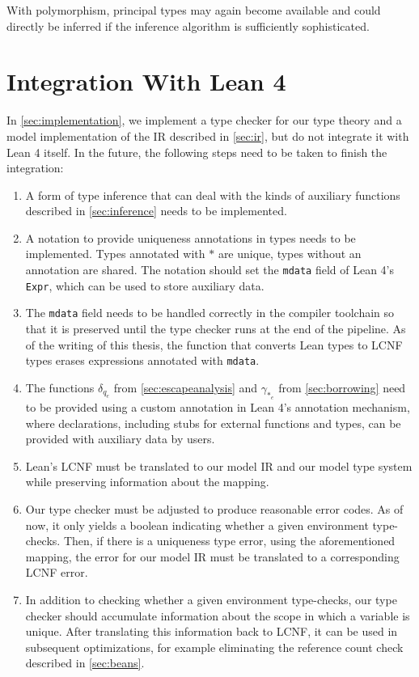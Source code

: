 With polymorphism, principal types may again become available and could directly be inferred if the inference algorithm is sufficiently sophisticated.

\section{Integration With Lean 4}
In \cref{sec:implementation}, we implement a type checker for our type theory and a model implementation of the IR described in \cref{sec:ir}, but do not integrate it with Lean 4 itself. In the future, the following steps need to be taken to finish the integration:
\begin{enumerate}
	\item A form of type inference that can deal with the kinds of auxiliary functions described in \cref{sec:inference} needs to be implemented.
	\item A notation to provide uniqueness annotations in types needs to be implemented. Types annotated with $*$ are unique, types without an annotation are shared. The notation should set the \lstinline|mdata| field of Lean 4's \lstinline|Expr|, which can be used to store auxiliary data.
	\item The \lstinline|mdata| field needs to be handled correctly in the compiler toolchain so that it is preserved until the type checker runs at the end of the pipeline. As of the writing of this thesis, the function that converts Lean types to LCNF types erases expressions annotated with \lstinline|mdata|.
	\item The functions $\delta_{q_e}$ from \cref{sec:escapeanalysis} and $\gamma_{*_e}$ from \cref{sec:borrowing} need to be provided using a custom annotation in Lean 4's annotation mechanism, where declarations, including stubs for external functions and types, can be provided with auxiliary data by users.
	\item Lean's LCNF must be translated to our model IR and our model type system while preserving information about the mapping.
	\item Our type checker must be adjusted to produce reasonable error codes. As of now, it only yields a boolean indicating whether a given environment type-checks. Then, if there is a uniqueness type error, using the aforementioned mapping, the error for our model IR must be translated to a corresponding LCNF error.
	\item In addition to checking whether a given environment type-checks, our type checker should accumulate information about the scope in which a variable is unique. After translating this information back to LCNF, it can be used in subsequent optimizations, for example eliminating the reference count check described in \cref{sec:beans}.
\end{enumerate}

